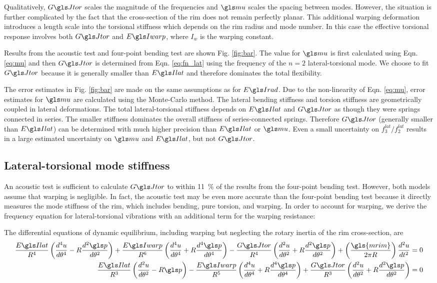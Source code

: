\documentclass[../thesis.tex]{subfiles}
\begin{document}
Qualitatively, $\GJ$ scales the magnitude of the frequencies and $\m$ scales the spacing between modes. However, the situation is further complicated by the fact that the cross-section of the rim does not remain perfectly planar. This additional warping deformation introduces a length scale into the torsional stiffness which depends on the rim radius and mode number. In this case the effective torsional response involves both $\GJ$ and $\EIw$, where $I_w$ is the warping constant.

Results from the acoustic test and four-point bending test are shown Fig. \ref{fig:bar}. The value for $\m$ is first calculated using Eqn. \eqref{eq:mu} and then $\GJ$ is determined from Eqn. \eqref{eq:fn_lat} using the frequency of the $n=2$ lateral-torsional mode. We choose to fit $\GJ$ because it is generally smaller than $\EIl$ and therefore dominates the total flexibility.

The error estimates in Fig. \ref{fig:bar} are made on the same assumptions as for $\EIr$. Due to the non-linearity of Eqn. \eqref{eq:mu}, error estimates for $\m$ are calculated using the Monte-Carlo method. The lateral bending stiffness and torsion stiffness are geometrically coupled in lateral deformations. The total lateral-torsional stiffness depends on $\EIl$ and $\GJ$ as though they were springs connected in series. The smaller stiffness dominates the overall stiffness of series-connected springs. Therefore $\GJ$ (generally smaller than $\EIl$) can be determined with much higher precision than $\EIl$ or $\m$. Even a small uncertainty on $f_3^{lat}/f_2^{lat}$ results in a large estimated uncertainty on $\m$ and $\EIl$, but not $\GJ$.

\subsection{Lateral-torsional mode stiffness}
An acoustic test is sufficient to calculate $\GJ$ to within \SI{11}{\percent} of the results from the four-point bending test. However, both models assume that warping is negligible. In fact, the acoustic test may be even more accurate than the four-point bending test because it directly measures the mode stiffness of the rim, which includes bending, pure torsion, and warping. In order to account for warping, we derive the frequency equation for lateral-torsional vibrations with an additional term for the warping resistance:

The differential equations of dynamic equilibrium, including warping but neglecting the rotary inertia of the rim cross-section, are
  \begin{subequations}\label{eq:lat_eq}
  \begin{align}
  \frac{\EIl}{R^4}\left(\dt{u}{4} - R\dt{\p}{2}\right) +
  \frac{\EIw}{R^6} \left(\dt{u}{4} + R\dt{\p}{4}\right) -
  \frac{\GJ}{R^4}\left(\dt{u}{2} + R\dt{\p}{2}\right) +
  \left(\frac{\gls{mrim}}{2\pi R}\right) \frac{d^2u}{dt^2} = 0\\
  \frac{\EIl}{R^3}\left(\dt{u}{2} - R\p\right) -
  \frac{\EIw}{R^5}\left(\dt{u}{4} + R\dt{\p}{4}\right) +
  \frac{\GJ}{R^3}\left(\dt{u}{2} + R\dt{\p}{2}\right) = 0
  \end{align}
  \end{subequations}
\end{document}
